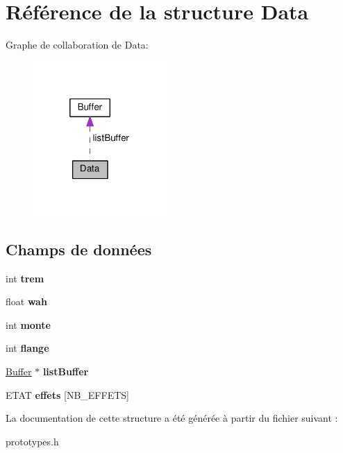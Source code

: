 \hypertarget{structData}{}\section{Référence de la structure Data}
\label{structData}


Graphe de collaboration de Data\+:\nopagebreak
\begin{figure}[H]
\begin{center}
\leavevmode
\includegraphics[width=145pt]{structData__coll__graph}
\end{center}
\end{figure}
\subsection*{Champs de données}
\begin{DoxyCompactItemize}
\item 
int {\bfseries trem}\hypertarget{structData_aafdd3e8b9ce54065d9b8af48ed2c5c28}{}\label{structData_aafdd3e8b9ce54065d9b8af48ed2c5c28}

\item 
float {\bfseries wah}\hypertarget{structData_a823699001bb8ad64413a43ec654c0a15}{}\label{structData_a823699001bb8ad64413a43ec654c0a15}

\item 
int {\bfseries monte}\hypertarget{structData_ae9616deb650b51b939c5da6fcc1f5f79}{}\label{structData_ae9616deb650b51b939c5da6fcc1f5f79}

\item 
int {\bfseries flange}\hypertarget{structData_aeaa1e3339f3bba1d4fbcbebfa8c3db30}{}\label{structData_aeaa1e3339f3bba1d4fbcbebfa8c3db30}

\item 
\hyperlink{structBuffer}{Buffer} $\ast$ {\bfseries list\+Buffer}\hypertarget{structData_aafae1d5d1ec1e4765f809268d848c932}{}\label{structData_aafae1d5d1ec1e4765f809268d848c932}

\item 
E\+T\+AT {\bfseries effets} \mbox{[}N\+B\+\_\+\+E\+F\+F\+E\+TS\mbox{]}\hypertarget{structData_ae336106816e30fe1c73fa9fa654b305d}{}\label{structData_ae336106816e30fe1c73fa9fa654b305d}

\end{DoxyCompactItemize}


La documentation de cette structure a été générée à partir du fichier suivant \+:\begin{DoxyCompactItemize}
\item 
prototypes.\+h\end{DoxyCompactItemize}
